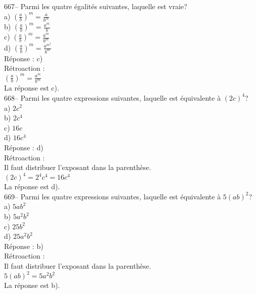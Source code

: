 ﻿\documentclass[letterpaper, 12pt]{article}
\begin{document}
667-- Parmi les quatre \'egalit\'es suivantes, laquelle est vraie?\\
a) $\left( \frac{a}{b}\right)^{m} =\frac{a}{b^{m}}$\\[2mm]
b) $\left( \frac{a}{b}\right)^{m} =\frac{a^{m}}{b}$\\[2mm]
c) $\left( \frac{a}{b}\right)^{m} =\frac{a^{m}}{b^{m}}$\\[2mm]
d) $\left( \frac{a}{b}\right)^{m} =\frac{a^{m^{2}}}{b^{m}}$\\

R\'eponse : c)\\

R\'etroaction : \\[2mm]
$\left( \frac{a}{b}\right)^{m} =\frac{a^{m}}{b^{m}}$\\[2mm]
La r\'eponse est c).\\

668-- Parmi les quatre expressions suivantes, laquelle est \'equivalente \`a
$\left( 2c\right) ^{4}$?\\
a) $2c^{2}$\\
b) $2c^{4}$\\
c) $16c$\\
d) $16c^{4}$\\

R\'eponse : d)\\

R\'etroaction : \\
Il faut distribuer l'exposant dans la parenth\`ese.\\
$\left( 2c\right) ^{4}=2^{4}c^{4}=16c^{4}$\\
La r\'eponse est d).\\

669-- Parmi les quatre expressions suivantes, laquelle est \'equivalente \`a
$5\left( ab\right) ^{2}$?\\
a) $5ab^{2}$\\
b) $5a^{2}b^{2}$\\
c) $25b^{2}$\\
d) $25a^{2}b^{2}$\\

R\'eponse : b)\\

R\'etroaction : \\
Il faut distribuer l'exposant dans la parenth\`ese.\\
$5\left( ab\right) ^{2}=5a^{2}b^{2}$\\
La r\'eponse est b).\\
\end{document}
